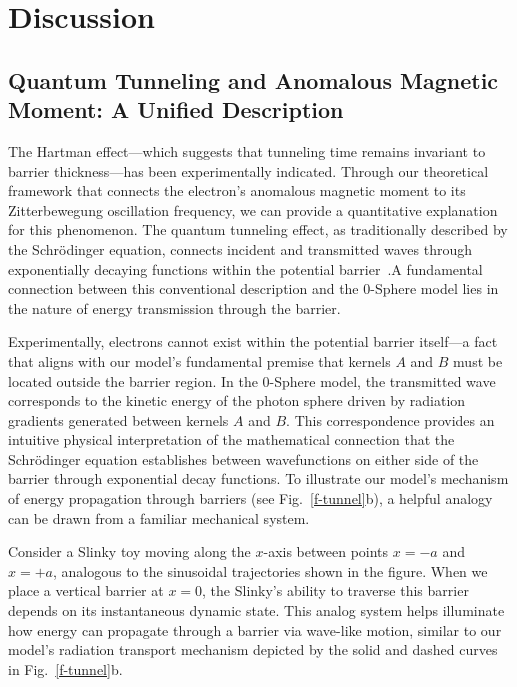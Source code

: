 \documentclass[%
 reprint,
 amsmath,amssymb,
 aps,
]{revtex4-1}
\numberwithin{equation}{section}%
\begin{document}
\section{Discussion}
\label{sec:discussion}

\subsection{Quantum Tunneling and Anomalous Magnetic Moment: A Unified Description}
\label{subsec:Quantum Tunneling and Anomalous}

The Hartman effect---which suggests that tunneling time remains invariant to barrier thickness—has been experimentally indicated. Through our theoretical framework that connects the electron's anomalous magnetic moment to its Zitterbewegung oscillation frequency, we can provide a quantitative explanation for this phenomenon. The quantum tunneling effect, as traditionally described by the Schrödinger equation, connects incident and transmitted waves through exponentially decaying functions within the potential barrier~\cite{cohen2019}.A fundamental connection between this conventional description and the 0-Sphere model lies in the nature of energy transmission through the barrier.

Experimentally, electrons cannot exist within the potential barrier itself---a fact that aligns with our model's fundamental premise that kernels $A$ and $B$ must be located outside the barrier region. In the 0-Sphere model, the transmitted wave corresponds to the kinetic energy of the photon sphere driven by radiation gradients generated between kernels $A$ and $B$. This correspondence provides an intuitive physical interpretation of the mathematical connection that the Schrödinger equation establishes between wavefunctions on either side of the barrier through exponential decay functions. To illustrate our model's mechanism of energy propagation through barriers (see Fig.~\ref{f-tunnel}b), a helpful analogy can be drawn from a familiar mechanical system.

Consider a Slinky toy moving along the $x$-axis between points $x = -a$ and $x = +a$, analogous to the sinusoidal trajectories shown in the figure. When we place a vertical barrier at $x = 0$, the Slinky's ability to traverse this barrier depends on its instantaneous dynamic state. This analog system helps illuminate how energy can propagate through a barrier via wave-like motion, similar to our model's radiation transport mechanism depicted by the solid and dashed curves in Fig.~\ref{f-tunnel}b.
\end{document}
